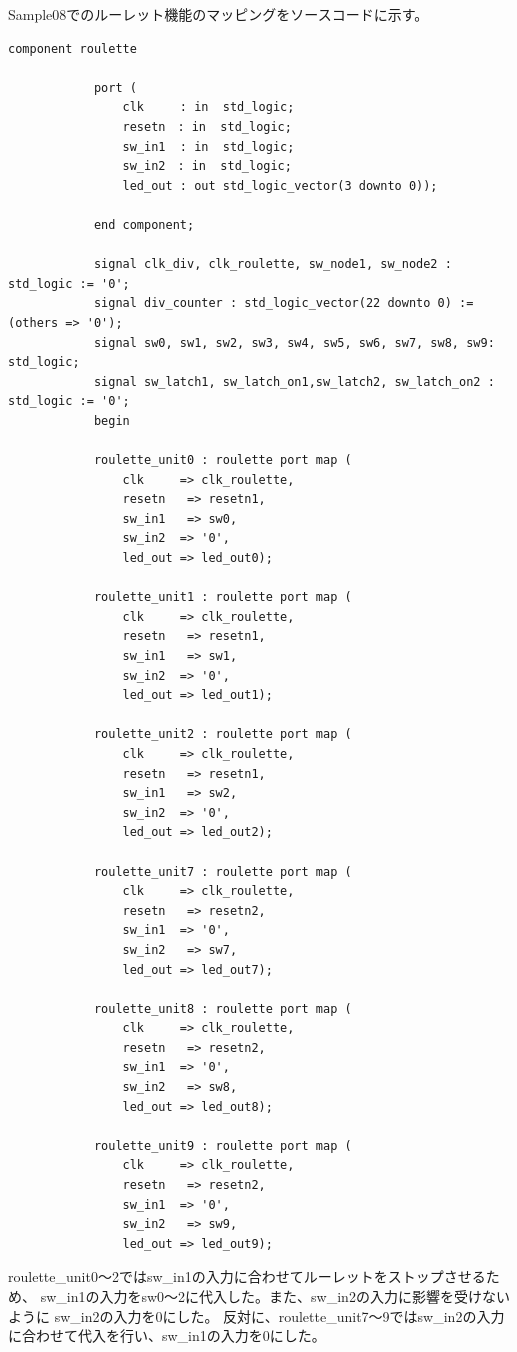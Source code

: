 \documentclass{ltjsarticle}
\begin{document}
			Sample08でのルーレット機能のマッピングをソースコードに示す。
			\begin{lstlisting}[caption = Sample08vhd::ルーレット機能のマッピング, label = code:rouletteMap]
			component roulette
			
			port (
				clk     : in  std_logic;
				resetn　: in  std_logic;
				sw_in1  : in  std_logic;
				sw_in2　: in  std_logic;
				led_out : out std_logic_vector(3 downto 0));

			end component;

			signal clk_div, clk_roulette, sw_node1, sw_node2 : std_logic := '0';
			signal div_counter : std_logic_vector(22 downto 0) := (others => '0');
			signal sw0, sw1, sw2, sw3, sw4, sw5, sw6, sw7, sw8, sw9: std_logic;
			signal sw_latch1, sw_latch_on1,sw_latch2, sw_latch_on2 : std_logic := '0';
			begin

			roulette_unit0 : roulette port map (
				clk     => clk_roulette,
				resetn   => resetn1,
				sw_in1   => sw0,
				sw_in2  => '0',
				led_out => led_out0);
			
			roulette_unit1 : roulette port map (
				clk     => clk_roulette,
				resetn   => resetn1,
				sw_in1   => sw1,
				sw_in2  => '0',
				led_out => led_out1);
			
			roulette_unit2 : roulette port map (
				clk     => clk_roulette,
				resetn   => resetn1,
				sw_in1   => sw2,
				sw_in2  => '0',
				led_out => led_out2);
			
			roulette_unit7 : roulette port map (
				clk     => clk_roulette,
				resetn   => resetn2,
				sw_in1  => '0',
				sw_in2   => sw7,
				led_out => led_out7);
			
			roulette_unit8 : roulette port map (
				clk     => clk_roulette,
				resetn   => resetn2,
				sw_in1  => '0',
				sw_in2   => sw8,
				led_out => led_out8);
				
			roulette_unit9 : roulette port map (
				clk     => clk_roulette,
				resetn   => resetn2,
				sw_in1  => '0',
				sw_in2   => sw9,
				led_out => led_out9);
			\end{lstlisting}

		roulette\_unit0〜2ではsw\_in1の入力に合わせてルーレットをストップさせるため、
		sw\_in1の入力をsw0〜2に代入した。また、sw\_in2の入力に影響を受けないように
		sw\_in2の入力を0にした。
		反対に、roulette\_unit7〜9ではsw\_in2の入力に合わせて代入を行い、sw\_in1の入力を0にした。
\end{document}
